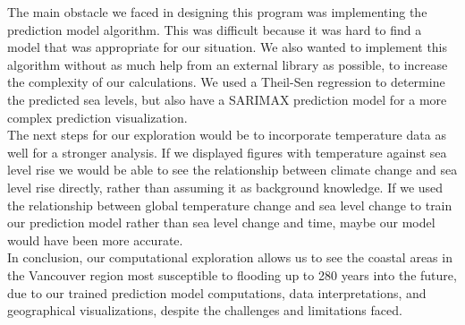 \documentclass[fontsize=11pt]{article}
\begin{document}
    The main obstacle we faced in designing this program was implementing the prediction model algorithm. This was difficult because it was hard to find a model that was appropriate for our situation. We also wanted to implement this algorithm without as much help from an external library as possible, to increase the complexity of our calculations. We used a Theil-Sen regression to determine the predicted sea levels, but also have a SARIMAX prediction model for a more complex prediction visualization. \\

    The next steps for our exploration would be to incorporate temperature data as well for a stronger analysis. If we displayed figures with temperature against sea level rise we would be able to see the relationship between climate change and sea level rise directly, rather than assuming it as background knowledge. If we used the relationship between global temperature change and sea level change to train our prediction model rather than sea level change and time, maybe our model would have been more accurate. \\

    In conclusion, our computational exploration allows us to see the coastal areas in the Vancouver region most susceptible to flooding up to 280 years into the future, due to our trained prediction model computations, data interpretations, and geographical visualizations, despite the challenges and limitations faced.
\end{document}
